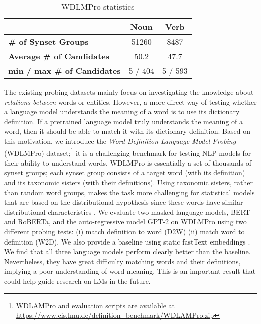 \documentclass[11pt,a4paper]{article}
\begin{document}
\begin{table}
    \centering
    \begin{tabular}{l|cc}
    \hline
         & \textbf{Noun} & \textbf{Verb} \\ \hline
         \textbf{\# of Synset Groups} & 51260 & 8487 \\
         \textbf{Average \# of Candidates} & 50.2 & 47.7 \\
         \textbf{min / max \# of Candidates} & 5 / 404 & 5 / 593 \\ \hline
    \end{tabular}
    \caption{WDLMPro statistics}
    \label{tab:dataset_stats}
\end{table}

The existing probing datasets mainly focus on investigating
the knowledge about \emph{relations between} words or
entities. However, a more direct way of testing whether a
language model understands the meaning of a word is to use
its dictionary definition. If a pretrained language model
truly understands the meaning of a word, then it should be
able to match it with its dictionary definition.  Based
on this motivation, we introduce the \textit{Word
  Definition Language Model Probing} (WDLMPro) dataset;\footnote{WDLAMPro and evaluation scripts are available at \href{https://www.cis.lmu.de/definition_benchmark/WDLAMPro.zip}{https://www.cis.lmu.de/definition\_benchmark/WDLAMPro.zip}} it
is a challenging benchmark for testing NLP models for their
ability to understand words.  WDLMPro is essentially a set
of thousands of synset groups; each synset group consists of
a target word (with its definition) and its taxonomic
sisters (with their definitions).
Using taxonomic sisters, rather than random word groups, 
makes the task more challenging for statistical models 
that are based on the distributional hypothesis since 
these words  have similar distributional characteristics
\cite{lenci08distributional}. We evaluate two masked
language models, BERT and RoBERTa, and the auto-regressive
model GPT-2 on WDLMPro using two different probing
tests: (i) match definition to word (D2W)
  (ii) match word to definition (W2D). We also provide a
  baseline using static fastText embeddings
  \cite{mikolov18fastText}.  We find that all three
language models perform clearly
better than the baseline. Nevertheless, they have great
difficulty matching words and their definitions, implying a
poor understanding of word meaning.  This is an important
result that could help guide research on LMs in the future.
\end{document}

